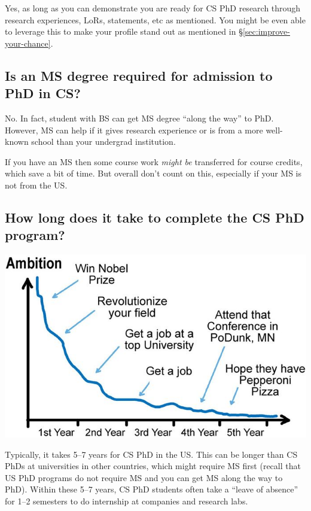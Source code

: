 \documentclass[11pt]{article}
\newenvironment{commentbox}[1][]{
\small
    \begin{cbox}
    \textbf{#1} 
 }{
   \end{cbox}
}
\begin{document}
Yes, as long as you can demonstrate you are ready for CS PhD research through research experiences, LoRs, statements, etc as mentioned. You might be even able to leverage this to make your profile stand out as mentioned in \S\ref{sec:improve-your-chance}. 

\subsection{Is an MS degree required for admission to PhD in CS?}
No. In fact, student with BS can get MS degree ``along the way'' to PhD.  However, MS can help if it gives research experience or is from a more well-known school than your undergrad institution. 

If you have an MS then some course work \emph{might be} transferred for course credits, which save a bit of time. But overall don't count on this, especially if your MS is not from the US. 


\subsection{How long does it take to complete the CS PhD program?}


\begin{center}
\includegraphics[scale=0.3]{c4a.png}
\end{center}


    Typically, it takes 5--7 years for CS PhD in the US.  This can be longer than CS PhDs at universities in other countries, which might require MS first (recall that US PhD programs do not require MS and you can get MS along the way to PhD). Within these 5--7 years, CS PhD students often take a ``leave of absence'' for 1--2 semesters to do internship at companies and research labs. 
    
\end{document}
